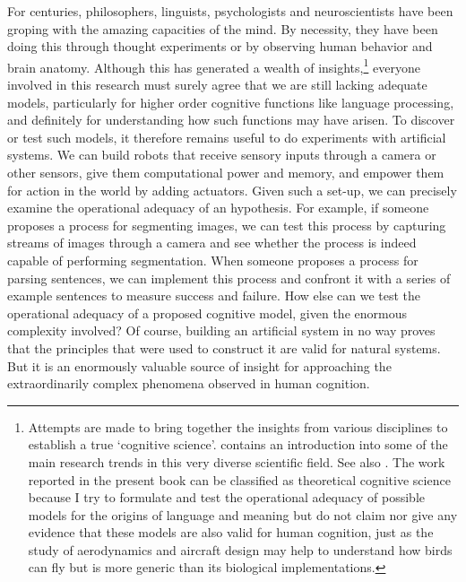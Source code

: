 For centuries, philosophers, linguists, psychologists and 
neuroscientists have been groping with the amazing capacities
of the mind. By necessity, they have been doing this through
thought experiments or by observing human behavior and
brain anatomy. Although this has generated a wealth
of insights,\footnote{Attempts are made to bring together the insights from various
disciplines to establish a true `cognitive science'. 
\cite{Osherton:1995} contains an introduction into some of the main 
research trends in this very diverse scientific field. 
See also \cite{Luger:1994}. The work reported in the present book can be 
classified as theoretical
cognitive science because I try to formulate and test
the operational adequacy of possible models for the 
origins of language and meaning but do not claim nor
give any evidence that these models are also valid for
human cognition, just as the study of aerodynamics and 
aircraft design may help to understand how birds can 
fly but is more generic than its biological 
implementations.}
everyone involved in this research must surely 
agree that we are still lacking adequate models, 
particularly for higher order cognitive functions like language
processing, and definitely for understanding how such 
functions may have arisen. 
To discover or test such models, it therefore
remains useful to do experiments with artificial systems.
We can build robots that receive sensory inputs
through a camera or other sensors, give them computational 
power and memory, and empower them 
for action in the world by adding actuators. Given such a 
set-up, we can precisely examine the operational adequacy 
of an hypothesis. For example, if someone proposes
a process for segmenting images, we can test this process 
by capturing streams of images through a camera and 
see whether the process is indeed capable of performing 
segmentation. When someone proposes a process 
for parsing sentences, we 
can implement this process and confront it with a series of 
example sentences to measure success and failure. 
How else can we test the operational adequacy of a proposed
cognitive model, given the enormous complexity involved? 
Of course, building an artificial system in no way proves
that the principles that were used to construct it are valid
for natural systems. But it is an enormously valuable 
source of insight for approaching the extraordinarily 
complex phenomena observed in human cognition. 

